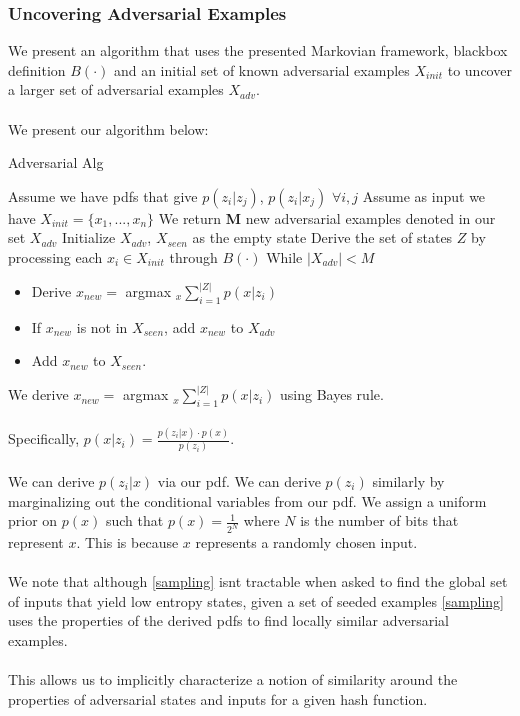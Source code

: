 \subsubsection{Uncovering Adversarial Examples}
We present an algorithm that uses the presented Markovian framework, blackbox definition $B(\cdot)$ and an initial set of known adversarial examples $X_{init}$ to uncover a larger set of adversarial examples $X_{adv}$. 
\\
\\
We present our algorithm below:

\begin{algorithm}
\caption{Adversarial Alg}\label{sampling}
\begin{algorithmic}[1]
\State Assume we have pdfs that give $p(z_{i} | z_{j})$, $p(z_{i} | x_{j})$ $\forall i,j$
\State Assume as input we have $X_{init} = \{x_{1}, ..., x_{n}\}$
\State We return \textbf{M} new adversarial examples denoted in our set $X_{adv}$
\State Initialize $X_{adv}$, $X_{seen}$ as the empty state
\State Derive the set of states $Z$ by processing each $x_{i} \in X_{init}$ through $B(\cdot)$
\State While $|X_{adv} | < M$
\begin{itemize}
\item Derive $x_{new} =$ argmax $_{x} \sum_{i=1}^{|Z|} p(x | z_{i})$
\item If $x_{new}$ is not in $X_{seen}$, add $x_{new}$ to $X_{adv}$
\item Add $x_{new}$ to $X_{seen}$.
\end{itemize}
\end{algorithmic}
\end{algorithm}

We derive $x_{new} =$ argmax $_{x} \sum_{i=1}^{|Z|} p(x | z_{i})$ using Bayes rule. 
\\
\\
Specifically, $p(x | z_{i}) = \frac{p(z_{i} | x) \cdot p(x)}{p(z_{i})}$. 
\\
\\
We can derive $p(z_{i} | x)$ via our pdf. We can derive $p(z_{i})$ similarly by marginalizing out the conditional variables from our pdf. We assign a uniform prior on $p(x)$ such that $p(x) = \frac{1}{2^{N}}$ where $N$ is the number of bits that represent $x$. This is because $x$ represents a randomly chosen input.
\\
\\
We note that although \ref{sampling} isnt tractable when asked to find the global set of inputs that yield low entropy states, given a set of seeded examples \ref{sampling} uses the properties of the derived pdfs to find locally similar adversarial examples. 
\\
\\
This allows us to implicitly characterize a notion of similarity around the properties of adversarial states and inputs for a given hash function. 


